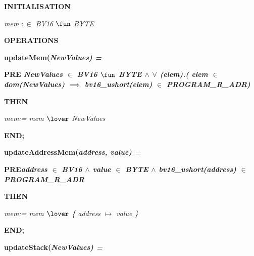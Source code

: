 \hspace*{0.20in}

\bf INITIALISATION

\hspace*{0.20in}\it mem  $:\in$  \it BV16  $\fun$  \it BYTE\hspace*{0.15in}

\hspace*{0.20in}

\bf OPERATIONS

\hspace*{0.20in}

\hspace*{0.20in}\bf updateMem\rm (\it NewValues\rm ) \rm =

\hspace*{0.20in}\bf PRE \it NewValues  $\in$  \it BV16  $\fun$  \it BYTE\hspace*{0.10in} $\land$   $\forall$ \rm (\it elem\rm )\rm .\rm ( \it elem  $\in$  \bf dom\rm (\it NewValues\rm )  $\implies$  \it bv16\_ushort\rm (\it elem\rm )  $\in$  \it PROGRAM\_R\_ADR\rm )

\hspace*{0.20in}\bf THEN

\hspace*{0.40in}\it mem\rm := \it mem  $\lover$  \it NewValues 

\hspace*{0.20in}\bf END\rm ;

\hspace*{0.20in}

\hspace*{0.20in}\bf updateAddressMem\rm (\it address\rm , \it value\rm ) \rm =

\hspace*{0.20in}\bf PRE\hspace*{0.15in}\it address  $\in$  \it BV16  $\land$  \it value  $\in$  \it BYTE  $\land$  \it bv16\_ushort\rm (\it address\rm )  $\in$  \it PROGRAM\_R\_ADR

\hspace*{0.20in}\bf THEN

\hspace*{0.40in}\it mem\rm := \it mem  $\lover$  \rm \{ \it address  $\mapsto$  \it value \rm \}

\hspace*{0.20in}\bf END\rm ;

\hspace*{0.20in}

\hspace*{0.20in}\bf updateStack\rm (\it NewValues\rm ) \rm =

